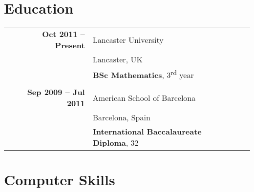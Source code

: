 \documentclass[a4paper,10pt]{article} %
\begin{document}
\section{\SC Education}

\begin{tabularx}{\textwidth}{XrlXr}

&\textbf{Oct 2011 -- Present} & Lancaster University & &\\
&                             & Lancaster, UK & & \\
&                             & \textbf{BSc Mathematics}, 3\textsuperscript{rd} year & &\\
\multicolumn{5}{c}{}\\


&\textbf{Sep 2009 -- Jul 2011} & American School of Barcelona & &\\
&                              & Barcelona, Spain & &\\
&                              & \textbf{International Baccalaureate Diploma}, 32 & &\\




\end{tabularx}


\section{\SC Computer Skills}
\end{document}
